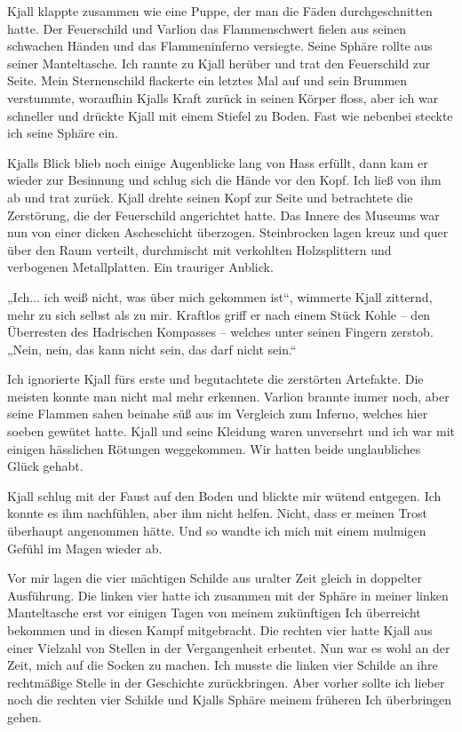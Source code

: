 \documentclass[10pt, a4paper, oneside]{book}
\begin{document}
Kjall klappte zusammen wie eine Puppe, der man die Fäden durchgeschnitten hatte. Der Feuerschild und Varlion das Flammenschwert fielen aus seinen schwachen Händen und das Flammeninferno versiegte. Seine Sphäre rollte aus seiner Manteltasche. Ich rannte zu Kjall herüber und trat den Feuerschild zur Seite. Mein Sternenschild flackerte ein letztes Mal auf und sein Brummen verstummte, woraufhin Kjalls Kraft zurück in seinen Körper floss, aber ich war schneller und drückte Kjall mit einem Stiefel zu Boden. Fast wie nebenbei steckte ich seine Sphäre ein.

Kjalls Blick blieb noch einige Augenblicke lang von Hass erfüllt, dann kam er wieder zur Besinnung und schlug sich die Hände vor den Kopf. Ich ließ von ihm ab und trat zurück. Kjall drehte seinen Kopf zur Seite und betrachtete die Zerstörung, die der Feuerschild angerichtet hatte. Das Innere des Museums war nun von einer dicken Ascheschicht überzogen. Steinbrocken lagen kreuz und quer über den Raum verteilt, durchmischt mit verkohlten Holzsplittern und verbogenen Metallplatten. Ein trauriger Anblick.

„Ich... ich weiß nicht, was über mich gekommen ist“, wimmerte Kjall zitternd, mehr zu sich selbst als zu mir. Kraftlos griff er nach einem Stück Kohle – den Überresten des Hadrischen Kompasses – welches unter seinen Fingern zerstob. „Nein, nein, das kann nicht sein, das darf nicht sein.“

Ich ignorierte Kjall fürs erste und begutachtete die zerstörten Artefakte. Die meisten konnte man nicht mal mehr erkennen. Varlion brannte immer noch, aber seine Flammen sahen beinahe süß aus im Vergleich zum Inferno, welches hier soeben gewütet hatte. Kjall und seine Kleidung waren unversehrt und ich war mit einigen hässlichen Rötungen weggekommen. Wir hatten beide unglaubliches Glück gehabt.

Kjall schlug mit der Faust auf den Boden und blickte mir wütend entgegen. Ich konnte es ihm nachfühlen, aber ihm nicht helfen. Nicht, dass er meinen Trost überhaupt angenommen hätte. Und so wandte ich mich mit einem mulmigen Gefühl im Magen wieder ab.

Vor mir lagen die vier mächtigen Schilde aus uralter Zeit gleich in doppelter Ausführung. Die linken vier hatte ich zusammen mit der Sphäre in meiner linken Manteltasche erst vor einigen Tagen von meinem zukünftigen Ich überreicht bekommen und in diesen Kampf mitgebracht. Die rechten vier hatte Kjall aus einer Vielzahl von Stellen in der Vergangenheit erbeutet. Nun war es wohl an der Zeit, mich auf die Socken zu machen. Ich musste die linken vier Schilde an ihre rechtmäßige Stelle in der Geschichte zurückbringen. Aber vorher sollte ich lieber noch die rechten vier Schilde und Kjalls Sphäre meinem früheren Ich überbringen gehen.
\end{document}
